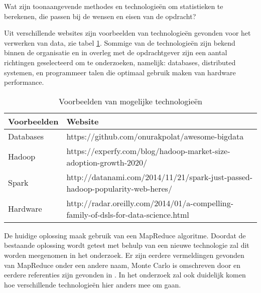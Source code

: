 Wat zijn toonaangevende methodes en technologieën om statistieken te berekenen, die passen bij de wensen en eisen van de opdracht?

Uit verschillende websites zijn voorbeelden van technologieën gevonden voor het verwerken van data, zie tabel \ref{tab:sites}. Sommige van de technologieën zijn bekend binnen de organisatie en in overleg met de opdrachtgever zijn een aantal richtingen geselecteerd om te onderzoeken, namelijk: databases, distributed systemen, en programmeer talen die optimaal gebruik maken van hardware performance.

\begin{table}[h]
\caption{Voorbeelden van mogelijke technologieën}
\label{tab:sites}
\def\arraystretch{1.5}
\begin{tabular}{|l|p{12.5cm}|}
\hline
\textbf{Voorbeelden} & \textbf{Website}                                                                 \\ \hline
Databases     & https://github.com/onurakpolat/awesome-bigdata                                     \\ \hline
Hadoop                                  & https://experfy.com/blog/hadoop-market-size-adoption-growth-2020/                  \\ \hline
Spark                                   & http://datanami.com/2014/11/21/spark-just-passed-hadoop-popularity-web-heres/      \\ \hline
Hardware                  & http://radar.oreilly.com/2014/01/a-compelling-family-of-dsls-for-data-science.html \\ \hline
\end{tabular}
\end{table}

De huidige oplossing maak gebruik van een MapReduce algoritme. Doordat de bestaande oplossing wordt getest met behulp van een nieuwe technologie zal dit worden meegenomen in het onderzoek. Er zijn eerdere vermeldingen gevonden van MapReduce onder een andere naam, Monte Carlo is omschreven door \textcite{asanovic2006landscape} en eerdere referenties zijn gevonden in \textcite{lee2010debunking}. In het onderzoek zal ook duidelijk komen hoe verschillende technologieën hier anders mee om gaan.
